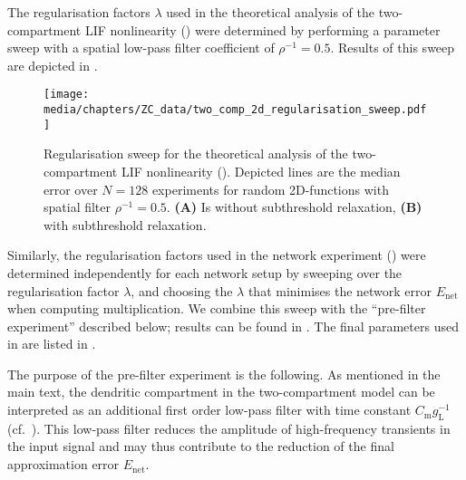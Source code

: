 The regularisation factors $\lambda$ used in the theoretical analysis of the two-compartment LIF nonlinearity () were determined by performing a parameter sweep with a spatial low-pass filter coefficient of $\rho^{-1} = 0.5$.
Results of this sweep are depicted in .
\begin{figure}
	\centering
	\texttt{[image: media/chapters/ZC\_data/two\_comp\_2d\_regularisation\_sweep.pdf]}
	\caption[Regularisation sweep for the theoretical analysis of the two-compartment LIF nonlinearity]{Regularisation sweep for the theoretical analysis of the two-compartment LIF nonlinearity (). Depicted lines are the median error over $N=128$ experiments for random 2D-functions with spatial filter $\rho^{-1} = 0.5$.
	\textbf{(A)} Is without subthreshold relaxation, \textbf{(B)} with subthreshold relaxation.}
	\label{fig:two_comp_2d_regularisation_sweep}
\end{figure}

Similarly, the regularisation factors used in the network experiment () were determined independently for each network setup by sweeping over the regularisation factor $\lambda$, and choosing the $\lambda$ that minimises the network error $E_\mathrm{net}$ when computing multiplication.
We combine this sweep with the \enquote{pre-filter experiment} described below; results can be found in .
The final parameters used in  are listed in .

The purpose of the pre-filter experiment is the following.
As mentioned in the main text, the dendritic compartment in the two-compartment model can be interpreted as an additional first order low-pass filter with time constant $C_\mathrm{m} g_\mathrm{L}^{-1}$ (cf.~).
This low-pass filter reduces the amplitude of high-frequency transients in the input signal and may thus contribute to the reduction of the final approximation error $E_\mathrm{net}$.

